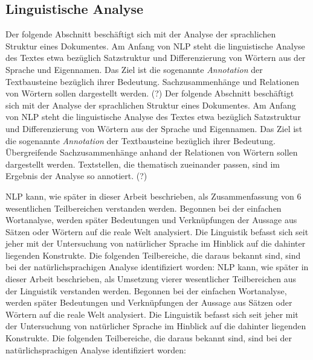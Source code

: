 \documentclass[12pt]{paper}
\begin{document}
\subsection{Linguistische Analyse}
Der folgende Abschnitt beschäftigt sich mit der Analyse der sprachlichen Struktur eines Dokumentes. Am Anfang von NLP steht die linguistische Analyse des Textes etwa bezüglich Satzstruktur und Differenzierung von Wörtern aus der Sprache und Eigennamen. Das Ziel ist die sogenannte \textit{Annotation} der Textbausteine bezüglich ihrer Bedeutung. Sachzusammenhänge und Relationen von Wörtern sollen dargestellt werden. (?)
Der folgende Abschnitt beschäftigt sich mit der Analyse der sprachlichen Struktur eines Dokumentes. Am Anfang von NLP steht die linguistische Analyse des Textes etwa bezüglich Satzstruktur und Differenzierung von Wörtern aus der Sprache und Eigennamen. Das Ziel ist die sogenannte \textit{Annotation} der Textbausteine bezüglich ihrer Bedeutung. Übergreifende Sachzusammenhänge anhand der Relationen von Wörtern sollen dargestellt werden. Textstellen, die thematisch zueinander passen, sind im Ergebnis der Analyse so annotiert. (?)

NLP kann, wie später in dieser Arbeit beschrieben, als Zusammenfassung von 6 wesentlichen Teilbereichen verstanden werden. Begonnen bei der einfachen Wortanalyse, werden später Bedeutungen und Verknüpfungen der Aussage aus Sätzen oder Wörtern auf die reale Welt analysiert. Die Linguistik befasst sich seit jeher mit der Untersuchung von natürlicher Sprache im Hinblick auf die dahinter liegenden Konstrukte. Die folgenden Teilbereiche, die daraus bekannt sind, sind bei der natürlichsprachigen Analyse identifiziert worden:
NLP kann, wie später in dieser Arbeit beschrieben, als Umsetzung vierer wesentlicher Teilbereichen aus der Linguistik verstanden werden. Begonnen bei der einfachen Wortanalyse, werden später Bedeutungen und Verknüpfungen der Aussage aus Sätzen oder Wörtern auf die reale Welt analysiert. Die Linguistik befasst sich seit jeher mit der Untersuchung von natürlicher Sprache im Hinblick auf die dahinter liegenden Konstrukte. Die folgenden Teilbereiche, die daraus bekannt sind, sind bei der natürlichsprachigen Analyse identifiziert worden:
\end{document}

